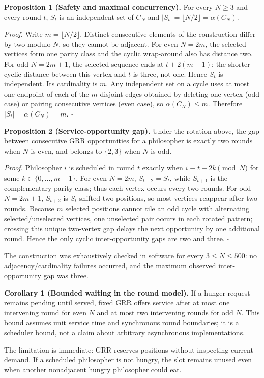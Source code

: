 \documentclass[10pt,journal]{IEEEtran}
\begin{document}
\textbf{Proposition 1 (Safety and maximal concurrency).} For every $N\ge3$ and every round $t$, $S_t$ is an independent set of $C_N$ and $|S_t|=\lfloor N/2\rfloor=\alpha(C_N)$.

\emph{Proof.} Write $m=\lfloor N/2\rfloor$. Distinct consecutive elements of the construction differ by two modulo $N$, so they cannot be adjacent. For even $N=2m$, the selected vertices form one parity class and the cyclic wrap-around also has distance two. For odd $N=2m+1$, the selected sequence ends at $t+2(m-1)$; the shorter cyclic distance between this vertex and $t$ is three, not one. Hence $S_t$ is independent. Its cardinality is $m$. Any independent set on a cycle uses at most one endpoint of each of the $m$ disjoint edges obtained by deleting one vertex (odd case) or pairing consecutive vertices (even case), so $\alpha(C_N)\le m$. Therefore $|S_t|=\alpha(C_N)=m$. \hfill$\square$

\textbf{Proposition 2 (Service-opportunity gap).} Under the rotation above, the gap between consecutive GRR opportunities for a philosopher is exactly two rounds when $N$ is even, and belongs to $\{2,3\}$ when $N$ is odd.

\emph{Proof.} Philosopher $i$ is scheduled in round $t$ exactly when $i\equiv t+2k\pmod N$ for some $k\in\{0,\ldots,m-1\}$. For even $N=2m$, $S_{t+2}=S_t$, while $S_{t+1}$ is the complementary parity class; thus each vertex occurs every two rounds. For odd $N=2m+1$, $S_{t+2}$ is $S_t$ shifted two positions, so most vertices reappear after two rounds. Because $m$ selected positions cannot tile an odd cycle with alternating selected/unselected vertices, one unselected pair occurs in each rotated pattern; crossing this unique two-vertex gap delays the next opportunity by one additional round. Hence the only cyclic inter-opportunity gaps are two and three. \hfill$\square$

The construction was exhaustively checked in software for every $3\le N\le500$: no adjacency/cardinality failures occurred, and the maximum observed inter-opportunity gap was three.

\textbf{Corollary 1 (Bounded waiting in the round model).} If a hunger request remains pending until served, fixed GRR offers service after at most one intervening round for even $N$ and at most two intervening rounds for odd $N$. This bound assumes unit service time and synchronous round boundaries; it is a scheduler bound, not a claim about arbitrary asynchronous implementations.

The limitation is immediate: GRR reserves positions without inspecting current demand. If a scheduled philosopher is not hungry, the slot remains unused even when another nonadjacent hungry philosopher could eat.
\end{document}
